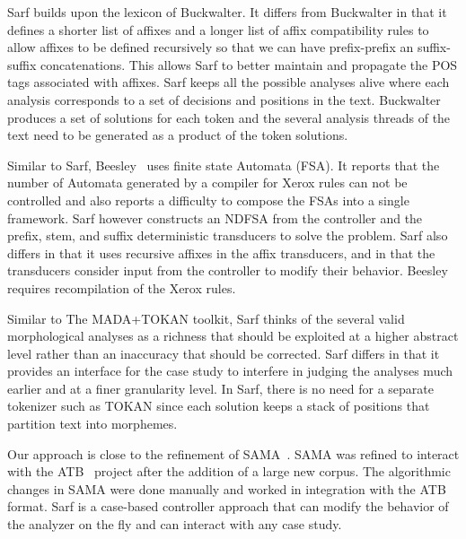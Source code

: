 \documentclass[11pt]{article}
\begin{document}
Sarf builds upon the lexicon of Buckwalter.
It differs from Buckwalter in that it defines a shorter list of affixes
and a longer list of affix compatibility rules to allow 
affixes to be defined recursively
so that we can have prefix-prefix an suffix-suffix 
concatenations.
This allows Sarf to better maintain and propagate 
the POS tags associated with affixes. 
Sarf keeps all the possible analyses alive where each analysis
corresponds to a set of decisions and positions in the text. 
Buckwalter produces a set of solutions for each token 
and the several analysis threads of the text need to be 
generated as a product of the token solutions. 

Similar to Sarf, Beesley~ uses
finite state Automata (FSA). 
It reports that the number of Automata generated by a compiler
for Xerox rules can not be controlled and also reports a difficulty 
to compose the FSAs into a single framework. 
Sarf however constructs an NDFSA from
the controller and the prefix, stem, and suffix deterministic 
transducers to solve the problem.
Sarf also differs in that it uses recursive affixes in the 
affix transducers, and in that the transducers consider
input from the controller to modify their behavior. 
Beesley requires recompilation of the Xerox rules.

Similar to The MADA+TOKAN toolkit, Sarf thinks of
the several valid morphological analyses as a richness that 
should be exploited at a higher abstract level rather than
an inaccuracy that should be corrected. 
Sarf differs in that it provides an interface for the 
case study to interfere in judging the analyses much earlier and
at a finer granularity level. 
In Sarf, there is no need for a separate tokenizer such as
TOKAN since each solution keeps a stack of positions
that partition text into morphemes.


Our approach is close to the refinement of SAMA~\cite{Maamouri:10}.
SAMA was refined to interact with
the ATB~\cite{Maamouri:04} project after the addition of a large 
new corpus. 
The algorithmic changes in SAMA were
done manually and worked in integration with the ATB format. 
Sarf is a case-based controller approach that can modify 
the behavior of the analyzer on the fly and can interact
with any case study. 
\end{document}
